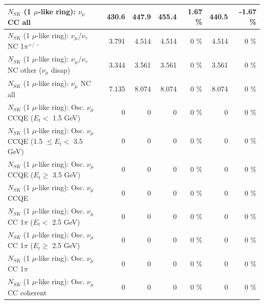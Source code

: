 \begin{table}
\begin{tabular}{| l | r | r | r  r | r  r |}
                                $N_{SK}$ (1 $\mu$-like ring): $\nu_{\mu}$ CC all &           430.6 &           447.9 &           455.4 &     1.67 \%  &           440.5 &    -1.67 \%  \\ 
\hline
              $N_{SK}$ (1 $\mu$-like ring): $\nu_\mu$/$\nu_\tau$ NC 1$\pi^{+/-}$ &           3.791 &           4.514 &           4.514 &        0 \%  &           4.514 &        0 \%  \\ 
   $N_{SK}$ (1 $\mu$-like ring): $\nu_\mu$/$\nu_\tau$ NC other ($\nu_\mu$ disap) &           3.344 &           3.561 &           3.561 &        0 \%  &           3.561 &        0 \%  \\ 
                                $N_{SK}$ (1 $\mu$-like ring): $\nu_{\mu}$ NC all &           7.135 &           8.074 &           8.074 &        0 \%  &           8.074 &        0 \%  \\ 
\hline
\hline
           $N_{SK}$ (1 $\mu$-like ring): Osc. $\nu_\mu$ CCQE ($E_{t} <$ 1.5 GeV) &               0 &               0 &               0 &        0 \%  &               0 &        0 \%  \\ 
  $N_{SK}$ (1 $\mu$-like ring): Osc. $\nu_\mu$ CCQE (1.5 $\leq E_{t} <$ 3.5 GeV) &               0 &               0 &               0 &        0 \%  &               0 &        0 \%  \\ 
        $N_{SK}$ (1 $\mu$-like ring): Osc. $\nu_\mu$ CCQE ($E_{t} \geq$ 3.5 GeV) &               0 &               0 &               0 &        0 \%  &               0 &        0 \%  \\ 
\hline
                               $N_{SK}$ (1 $\mu$-like ring): Osc. $\nu_\mu$ CCQE &               0 &               0 &               0 &        0 \%  &               0 &        0 \%  \\ 
\hline
      $N_{SK}$ (1 $\mu$-like ring): Osc. $\nu_\mu$ CC 1$\pi$ ($E_{t} <$ 2.5 GeV) &               0 &               0 &               0 &        0 \%  &               0 &        0 \%  \\ 
   $N_{SK}$ (1 $\mu$-like ring): Osc. $\nu_\mu$ CC 1$\pi$ ($E_{t} \geq$ 2.5 GeV) &               0 &               0 &               0 &        0 \%  &               0 &        0 \%  \\ 
\hline
                          $N_{SK}$ (1 $\mu$-like ring): Osc. $\nu_\mu$ CC 1$\pi$ &               0 &               0 &               0 &        0 \%  &               0 &        0 \%  \\ 
                        $N_{SK}$ (1 $\mu$-like ring): Osc. $\nu_\mu$ CC coherent &               0 &               0 &               0 &        0 \%  &               0 &        0 \%  \\ 

\end{tabular}
\end{table}
